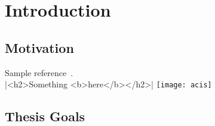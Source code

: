 \chapter{Introduction}

\section{Motivation}
Sample reference~\cite{Weng98}.\\
|<h2>Something <b>here</b></h2>|
\texttt{[image: acis]}
\newpage

\section{Thesis Goals}

\blankpage
